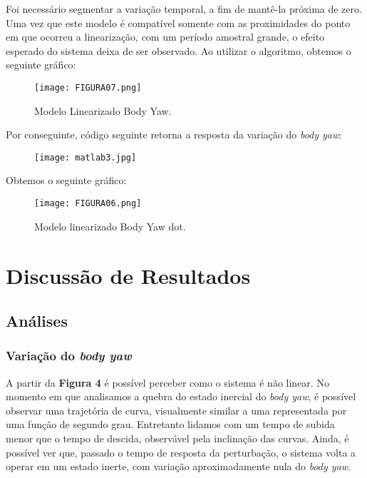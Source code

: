 \documentclass[12pt]{article}
\begin{document}
\quad Foi necessário segmentar a variação temporal, a fim de  mantê-la próxima de zero. Uma vez que este modelo é compatível somente com as proximidades do ponto em que ocorreu a linearização, com um período amostral grande, o efeito esperado do sistema deixa de ser observado. Ao utilizar o algoritmo, obtemos o seguinte gráfico:

\begin{figure}[H] 
    \centering
    \texttt{[image: FIGURA07.png]}
    \caption{Modelo Linearizado Body Yaw.}
    \label{fig:mesh3}
\end{figure}

Por conseguinte, código seguinte retorna a resposta da variação do \emph{body yaw}:

\begin{figure}[H] 
    \centering
    \texttt{[image: matlab3.jpg]}
    \label{fig:mesh3}
\end{figure}


\quad Obtemos o seguinte gráfico:

\begin{figure}[H] 
    \centering
    \texttt{[image: FIGURA06.png]}
    \caption{Modelo linearizado Body Yaw dot.}
    \label{fig:mesh3}
\end{figure}
\section{Discussão de Resultados}
\subsection{Análises}

\subsubsection{Variação do \emph{body yaw}}

\quad A partir da \textbf{Figura 4} é possível perceber como o sistema é não linear. No momento em que analisamos a
quebra do estado inercial do \emph{body yaw}, é possível observar uma trajetória de
curva, visualmente similar a uma representada por uma função de segundo
grau. Entretanto lidamos com um tempo de subida menor que o
tempo de descida, observável pela inclinação das curvas. Ainda, é possível ver
que, passado o tempo de resposta da perturbação, o sistema volta a operar em
um estado inerte, com variação aproximadamente nula do \emph{body yaw}.
\end{document}
